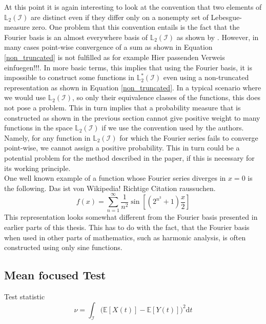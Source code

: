 \documentclass[12pt, a4paper]{article}
\theoremstyle{MAstyle} \newtheorem{assumption}{Assumption}[section]
\theoremstyle{MAstyle} \newtheorem{definition}{Definition}[section]
\begin{document}
			At this point it is again interesting to look at the convention that two elements of $\mathbb{L}_2(\mathcal{I})$ are distinct even if they differ only on a nonempty set of Lebesgue-measure zero. One problem that this convention entails is the fact that the Fourier basis is an almost everywhere basis of $\mathbb{L}_2\left(\mathcal{I}\right)$ as shown by \cite{carleson_convergence_1966}. However, in many cases point-wise convergence of a sum as shown in Equation \ref{non_truncated} is not fulfilled as for example {\color{red} Hier passenden Verweis einfuegen!!!}. In more basic terms, this implies that using the Fourier basis, it is impossible to construct some functions in $\mathbb{L}^{*}_2\left(\mathcal{I}\right)$ even using a non-truncated representation as shown in Equation \ref{non_truncated}.			
			In a typical scenario where we would use $\mathbb{L}_2\left(\mathcal{I}\right)$, so only their equivalence classes of the functions, this does not pose a problem. 
			This in turn implies that a probability measure that is constructed as shown in the previous section cannot give positive weight to many functions in the space $\mathbb{L}_2(\mathcal{I})$ if we use the convention used by the authors. Namely, for any function in $\mathbb{L}_2(\mathcal{I})$ for which the Fourier series fails to converge point-wise, we cannot assign a positive probability. This in turn could be a potential problem for the method described in the paper, if this is necessary for its working principle.\\
			
			One well known example of a function whose Fourier series diverges in $x=0$ is the following. {\color{red} Das ist von Wikipedia! Richtige Citation raussuchen.}
			\begin{equation}
				f(x) = \sum_{n = 1}^{\infty} \frac{1}{n^2}\sin\left[\left(2^{n^3} + 1\right)\frac{x}{2}\right]
			\end{equation}
			This representation looks somewhat different from the Fourier basis presented in earlier parts of this thesis. This has to do with the fact, that the Fourier basis when used in other parts of mathematics, such as harmonic analysis, is often constructed using only sine functions.
			
		\subsection{Mean focused Test}
			
			Test statistic
			\begin{equation}
				\nu = \int_{\mathcal{I}} \big(\mathbb{E}\left[X(t)\right] - \mathbb{E}\left[Y(t)\right]\big)^2 \mathrm{d}t
			\end{equation}
		
\end{document}
